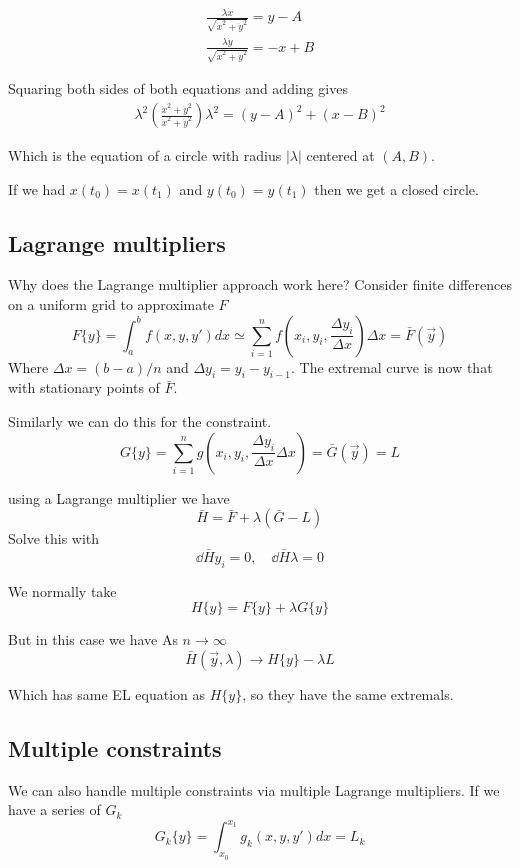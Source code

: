 \documentclass{X:/Documents/Coding/Latex/myassignment}
\begin{document}
\begin{align*}
	\frac{\lambda \dot x}{\sqrt{\dot x^2 + \dot y^2}} = y - A\\
	\frac{\lambda \dot y}{\sqrt{\dot x^2 + \dot y^2}} = -x + B
\end{align*}

Squaring both sides of both equations and adding gives
\begin{align*}
	\lambda^2\left(\frac{ \dot x^2 + \dot y^2}{\dot x^2 + \dot y^2}\right)
	\lambda^2 = (y-A)^2 + (x-B)^2
\end{align*}

Which is the equation of a circle with radius $|\lambda|$ centered at $(A,B)$.

If we had $x(t_0) = x(t_1)$ and $y(t_0) = y(t_1)$ then we get a closed circle. 

\subsection{Lagrange multipliers}
Why does the Lagrange multiplier approach work here?
Consider finite differences on a uniform grid to approximate $F$
\[F\{y\} = \int_a^b f(x,y,y') dx \simeq \sum_{i=1}^{n} f\left(x_i,y_i,\frac{\Delta y_i}{\Delta x}\right) \Delta x = \bar{F}(\vec y)\]
Where $\Delta x = (b-a)/n$ and $\Delta y_i = y_i - y_{i-1}$. The extremal curve is now that with stationary points of $\bar{F}$.

Similarly we can do this for the constraint.
\[G\{y\} = \sum_{i=1}^n g\left(x_i,y_i, \frac{\Delta y_i}{\Delta x} \Delta x\right) = \bar{G}(\vec y) = L\]

using a Lagrange multiplier we have
\[\bar{H} = \bar{F} + \lambda (\bar{G} - L)\]
Solve this with
\[\dd{\bar{H}}{y_i} = 0, \quad \dd{\bar{H}}{\lambda} = 0\]

We normally take
\[H\{y\} = F\{y\} + \lambda G\{y\}\]

But in this case we have
As $n\to \infty$
\[\bar{H}(\vec y,\lambda) \to H\{y\} - \lambda L\]

Which has same EL equation as $H\{y\}$, so they have the same extremals.



\subsection{Multiple constraints}
We can also handle multiple constraints via multiple Lagrange multipliers. If we have a series of $G_k$
\[G_k\{y\} = \int_{x_0}^{x_1} g_k(x,y,y') dx = L_k\]
\end{document}
